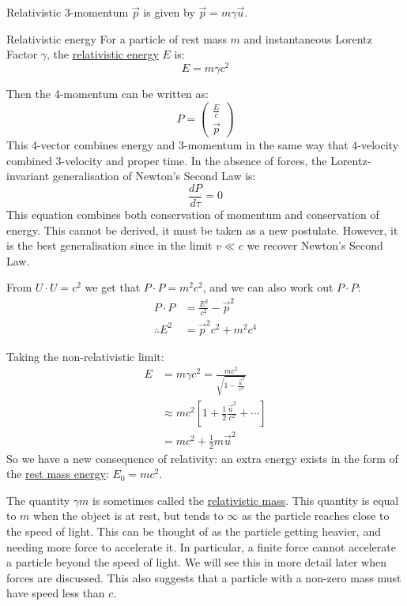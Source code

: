 \documentclass[../Main.tex]{subfiles}
\begin{document}
Relativistic 3-momentum $\vec{p}$ is given by $\vec{p} = m\gamma \vec{u}$.
\begin{definition}{Relativistic energy}
    For a particle of rest mass $m$ and instantaneous Lorentz Factor $\gamma$, the \underline{relativistic energy} $E$ is:
    \begin{equation*}
        E = m\gamma c^2
    \end{equation*}
\end{definition}
Then the 4-momentum can be written as:
\begin{equation*}
    P = \begin{pmatrix}\frac{E}{c} \\ \vec{p} \end{pmatrix}
\end{equation*}
This 4-vector combines energy and 3-momentum in the same way that 4-velocity combined 3-velocity and proper time. In the absence of forces, the Lorentz-invariant generalisation of Newton's Second Law is:
\begin{equation}
    \frac{dP}{d\tau} = 0
    \label{eqnNewtonIRelativity}
\end{equation}
This equation combines both conservation of momentum and conservation of energy. This cannot be derived, it must be taken as a new postulate. However, it is the best generalisation since in the limit $v \ll c$ we recover Newton's Second Law.

From $U \cdot U = c^2$ we get that $P \cdot P = m^2 c^2$, and we can also work out $P \cdot P$:
\begin{align*}
    P \cdot P &= \frac{E^2}{c^2} - \vec{p}^2 \\
    \therefore E^2 &= \vec{p}^2 c^2 + m^2 c^4
\end{align*}

Taking the non-relativistic limit:
\begin{align*}
    E &= m\gamma c^2 = \frac{mc^2}{\sqrt{1 - \frac{\vec{u}^2}{c^2}}} \\
    &\approx mc^2 \left[1 + \frac{1}{2} \frac{\vec{u}^2}{c^2} + \cdots \right] \\
    &= mc^2 + \frac{1}{2} m\vec{u}^2
\end{align*}
So we have a new consequence of relativity: an extra energy exists in the form of the \underline{rest mass energy}: $E_0 = mc^2$.

The quantity $\gamma m$ is sometimes called the \underline{relativistic mass}. This quantity is equal to $m$ when the object is at rest, but tends to $\infty$ as the particle reaches close to the speed of light. This can be thought of as the particle getting heavier, and needing more force to accelerate it. In particular, a finite force cannot accelerate a particle beyond the speed of light. We will see this in more detail later when forces are discussed. This also suggests that a particle with a non-zero mass must have speed less than $c$.
\end{document}
